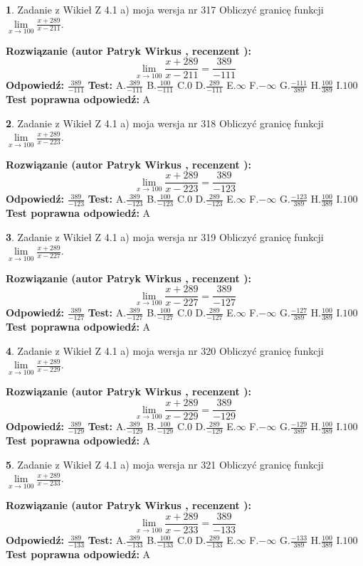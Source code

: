 \documentclass[12pt, a4paper]{article}
\theoremstyle{definition} %
\newtheorem{zad}{}
\newcommand{\zadStart}[1]{\begin{zad}#1\newline}
\newcommand{\zadStop}{\end{zad}}
\newcommand{\rozwStart}[2]{\noindent \textbf{Rozwiązanie (autor #1 , recenzent #2): }\newline}
\newcommand{\rozwStop}{\newline}
\newcommand{\odpStart}{\noindent \textbf{Odpowiedź:}\newline}
\newcommand{\odpStop}{\newline}
\newcommand{\testStart}{\noindent \textbf{Test:}\newline}
\newcommand{\testStop}{\newline}
\newcommand{\kluczStart}{\noindent \textbf{Test poprawna odpowiedź:}\newline}
\newcommand{\kluczStop}{\newline}
\begin{document}
\zadStart{Zadanie z Wikieł Z 4.1 a) moja wersja nr 317}
Obliczyć granicę funkcji $\lim\limits_{x\to100}\frac{x+289}{x-211}$.
\zadStop
\rozwStart{Patryk Wirkus}{}
$$\lim\limits_{x\to100}\frac{x+289}{x-211} = \frac{389}{-111}$$
\rozwStop
\odpStart
$\frac{389}{-111}$
\odpStop
\testStart
A.$\frac{389}{-111}$
B.$\frac{100}{-111}$
C.$0$
D.$\frac{289}{-111}$
E.$\infty$
F.$-\infty$
G.$\frac{-111}{389}$
H.$\frac{100}{389}$
I.$100$
\testStop
\kluczStart
A
\kluczStop



\zadStart{Zadanie z Wikieł Z 4.1 a) moja wersja nr 318}
Obliczyć granicę funkcji $\lim\limits_{x\to100}\frac{x+289}{x-223}$.
\zadStop
\rozwStart{Patryk Wirkus}{}
$$\lim\limits_{x\to100}\frac{x+289}{x-223} = \frac{389}{-123}$$
\rozwStop
\odpStart
$\frac{389}{-123}$
\odpStop
\testStart
A.$\frac{389}{-123}$
B.$\frac{100}{-123}$
C.$0$
D.$\frac{289}{-123}$
E.$\infty$
F.$-\infty$
G.$\frac{-123}{389}$
H.$\frac{100}{389}$
I.$100$
\testStop
\kluczStart
A
\kluczStop



\zadStart{Zadanie z Wikieł Z 4.1 a) moja wersja nr 319}
Obliczyć granicę funkcji $\lim\limits_{x\to100}\frac{x+289}{x-227}$.
\zadStop
\rozwStart{Patryk Wirkus}{}
$$\lim\limits_{x\to100}\frac{x+289}{x-227} = \frac{389}{-127}$$
\rozwStop
\odpStart
$\frac{389}{-127}$
\odpStop
\testStart
A.$\frac{389}{-127}$
B.$\frac{100}{-127}$
C.$0$
D.$\frac{289}{-127}$
E.$\infty$
F.$-\infty$
G.$\frac{-127}{389}$
H.$\frac{100}{389}$
I.$100$
\testStop
\kluczStart
A
\kluczStop



\zadStart{Zadanie z Wikieł Z 4.1 a) moja wersja nr 320}
Obliczyć granicę funkcji $\lim\limits_{x\to100}\frac{x+289}{x-229}$.
\zadStop
\rozwStart{Patryk Wirkus}{}
$$\lim\limits_{x\to100}\frac{x+289}{x-229} = \frac{389}{-129}$$
\rozwStop
\odpStart
$\frac{389}{-129}$
\odpStop
\testStart
A.$\frac{389}{-129}$
B.$\frac{100}{-129}$
C.$0$
D.$\frac{289}{-129}$
E.$\infty$
F.$-\infty$
G.$\frac{-129}{389}$
H.$\frac{100}{389}$
I.$100$
\testStop
\kluczStart
A
\kluczStop



\zadStart{Zadanie z Wikieł Z 4.1 a) moja wersja nr 321}
Obliczyć granicę funkcji $\lim\limits_{x\to100}\frac{x+289}{x-233}$.
\zadStop
\rozwStart{Patryk Wirkus}{}
$$\lim\limits_{x\to100}\frac{x+289}{x-233} = \frac{389}{-133}$$
\rozwStop
\odpStart
$\frac{389}{-133}$
\odpStop
\testStart
A.$\frac{389}{-133}$
B.$\frac{100}{-133}$
C.$0$
D.$\frac{289}{-133}$
E.$\infty$
F.$-\infty$
G.$\frac{-133}{389}$
H.$\frac{100}{389}$
I.$100$
\testStop
\kluczStart
A
\kluczStop
\end{document}
